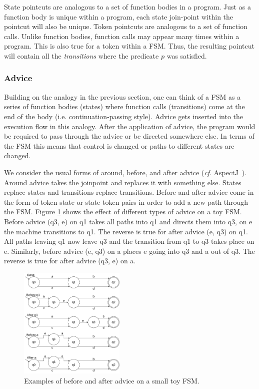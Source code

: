\documentclass[conference]{IEEEtran}
\begin{document}
State pointcuts are analogous to a set of function bodies in a program. Just as a function body is unique within a program, each state join-point within the pointcut will also be unique. Token pointcuts are analogous to a set of function calls. Unlike function bodies, function calls may appear many times within a program. This is also true for a token within a FSM. Thus, the resulting pointcut will contain all the \emph{transitions} where the predicate $p$ was satisfied. 

\subsubsection{Advice}
Building on the analogy in the previous section, one can think of a FSM as a series of function bodies (states) where function calls (transitions) come at the end of the body (i.e. continuation-passing style). Advice gets inserted into the execution flow in this analogy. After the application of advice, the program would be required to pass through the advice or be directed somewhere else. In terms of the FSM this means that control is changed or paths to different states are changed.

We consider the usual forms of around, before, and after advice (\emph{cf}. AspectJ~\cite{AspectJ:01}). Around advice takes the joinpoint and replaces it with something else. States replace states and transitions replace transitions. Before and after advice come in the form of token-state or state-token pairs in order to add a new path through the FSM. Figure \ref{fig:adviceExamples} shows the effect of different types of advice on a toy FSM. Before advice (q3, e) on q1 takes all paths into q1 and directs them into q3, on e the machine transitions to q1. The reverse is true for after advice (e, q3) on q1. All paths leaving q1 now leave q3 and the transition from q1 to q3 takes place on e. Similarly, before advice (e, q3) on a places e going into q3 and a out of q3. The reverse is true for after advice (q3, e) on a.

\begin{figure}[ht]
    \centering
    \includegraphics[width=0.45\textwidth]{isca2023-latex-template/figures/AdviceExamples.drawio.pdf}
    \caption{Examples of before and after advice on a small toy FSM.}
    \label{fig:adviceExamples}
\end{figure}
\end{document}
